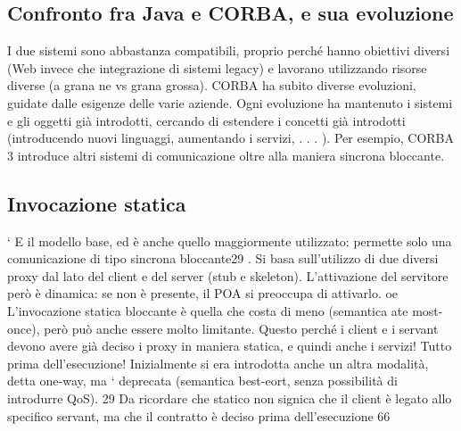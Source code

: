 \subsection{Confronto fra Java e CORBA, e sua evoluzione}
I due sistemi sono abbastanza compatibili, proprio perché hanno obiettivi diversi
(Web invece che integrazione di sistemi legacy) e lavorano utilizzando risorse
diverse (a grana ne vs grana grossa).
CORBA ha subito diverse evoluzioni, guidate dalle esigenze delle varie aziende.
Ogni evoluzione ha mantenuto i sistemi e gli oggetti già introdotti, cercando di
estendere i concetti già introdotti (introducendo nuovi linguaggi, aumentando i
servizi, . . . ). Per esempio, CORBA 3 introduce altri sistemi di comunicazione
oltre alla maniera sincrona bloccante.
\subsection{Invocazione statica}
`
E il modello base, ed è anche quello maggiormente utilizzato: permette solo una
comunicazione di tipo sincrona bloccante29 . Si basa sull'utilizzo di due diversi
proxy dal lato del client e del server (stub e skeleton). L'attivazione del servitore
però è dinamica: se non è presente, il POA si preoccupa di attivarlo.
oe
L'invocazione statica bloccante è quella che costa di meno (semantica ate
most-once), però può anche essere molto limitante. Questo perché i client e
i servant devono avere già deciso i proxy in maniera statica, e quindi anche i
servizi! Tutto prima dell'esecuzione!
Inizialmente si era introdotta anche un altra modalità, detta one-way, ma `
deprecata (semantica best-eort, senza possibilità di introdurre QoS).
29 Da ricordare che statico non signica che il client è legato allo specifico servant, ma che il
contratto è deciso prima dell'esecuzione
66
